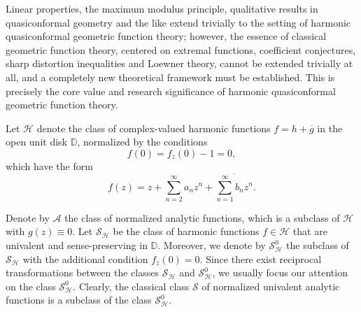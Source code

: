 \documentclass[11pt, reqno]{amsart}
\numberwithin{equation}{section}
\newcommand{\abs}[1]{\left\vert#1\right\vert}
\newcommand{\C}{\mbox{$\mathbb{C}$}}
\newcommand{\D}{\mbox{$\mathbb{D}$}}
\begin{document}
Linear properties, the maximum modulus principle, qualitative results in quasiconformal geometry and the like extend trivially to the setting of harmonic quasiconformal geometric function theory; however, the essence of classical geometric function theory, centered on extremal functions, coefficient conjectures, sharp distortion inequalities and Loewner theory, cannot be extended trivially at all, and a completely new theoretical framework must be established. This is precisely the core value and research significance of harmonic quasiconformal geometric function theory.





Let $\mathcal{H}$ denote the class of complex-valued harmonic functions
$f=h+\overline{g}$ in the open unit disk $\D$, normalized by the conditions $$f(0)=f_{z}(0)-1=0,$$ which have the
form
\begin{equation}\label{111}
f(z)=z+\sum_{n=2}^{\infty}a_nz^n+\overline{\sum_{n=1}^{\infty}b_nz^n}.
\end{equation}

Denote by $\mathcal{A}$ the class of normalized analytic functions, which is a subclass of
$\mathcal{H}$ with $g(z)\equiv 0$.
Let $\mathcal{S_{\mathcal{H}}}$ be the class of harmonic functions $f\in\mathcal{H}$
that are univalent and sense-preserving in $\D$. Moreover, we denote by $\mathcal{S}^{0}_{\mathcal{H}}$ the subclass of $\mathcal{S_{\mathcal{H}}}$ with the additional condition $f_{\overline{z}}(0)=0$. Since there exist reciprocal transformations between the classes $\mathcal{S_{\mathcal{H}}}$
and $\mathcal{S}^{0}_{\mathcal{H}}$, we usually focus our attention on the class $\mathcal{S}^{0}_{\mathcal{H}}$.  Clearly, the classical class $\mathcal{S}$ of normalized univalent analytic functions is a subclass of the class
$\mathcal{S}_\mathcal{H}^0$. %
\end{document}
